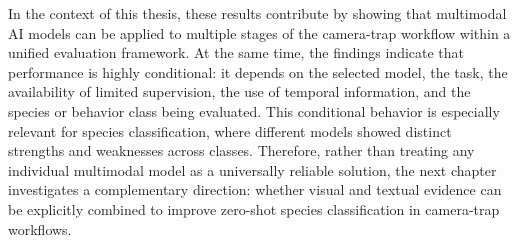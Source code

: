 In the context of this thesis, these results contribute by showing that multimodal AI models can be applied to multiple stages of the camera-trap workflow within a unified evaluation framework. At the same time, the findings indicate that performance is highly conditional: it depends on the selected model, the task, the availability of limited supervision, the use of temporal information, and the species or behavior class being evaluated. This conditional behavior is especially relevant for species classification, where different models showed distinct strengths and weaknesses across classes. Therefore, rather than treating any individual multimodal model as a universally reliable solution, the next chapter investigates a complementary direction: whether visual and textual evidence can be explicitly combined to improve zero-shot species classification in camera-trap workflows.
